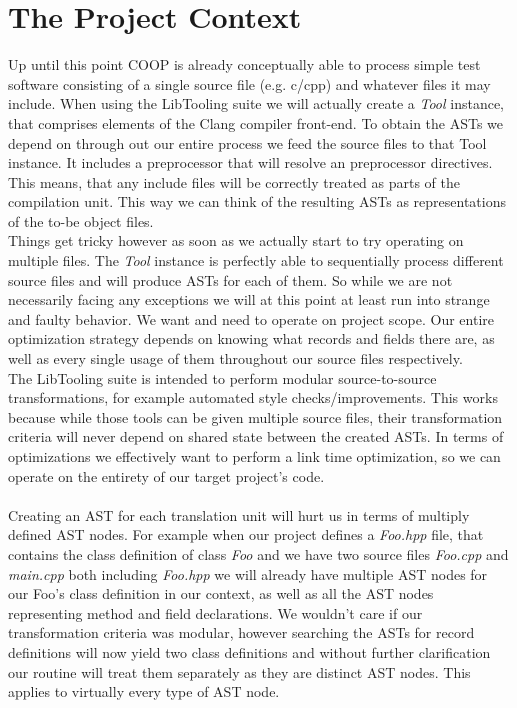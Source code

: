 \chapter{The Project Context}\label{project_scope_transformations}
Up until this point COOP is already conceptually able to process simple test software consisting of a single source file (e.g. c/cpp) and whatever files it may include. When using the LibTooling suite we will actually create a \textit{Tool} instance, that comprises elements of the Clang compiler front-end. To obtain the ASTs we depend on through out our entire process we feed the source files to that Tool instance. It includes a preprocessor that will resolve an preprocessor directives. This means, that any include files will be correctly treated as parts of the compilation unit. This way we can think of the resulting ASTs as representations of the to-be object files.\\
Things get tricky however as soon as we actually start to try operating on multiple files. The \textit{Tool} instance is perfectly able to sequentially process different source files and will produce ASTs for each of them. So while we are not necessarily facing any exceptions we will at this point at least run into strange and faulty behavior. We want and need to operate on project scope. Our entire optimization strategy depends on knowing what records and fields there are, as well as every single usage of them throughout our source files respectively.\\
The LibTooling suite is intended to perform modular source-to-source transformations, for example automated style checks/improvements. This works because while those tools can be given multiple source files, their transformation criteria will never depend on shared state between the created ASTs. In terms of optimizations we effectively want to perform a link time optimization, so we can operate on the entirety of our target project's code.\\\\
Creating an AST for each translation unit will hurt us in terms of multiply defined AST nodes. For example when our project defines a \textit{Foo.hpp} file, that contains the class definition of class \textit{Foo} and we have two source files \textit{Foo.cpp} and \textit{main.cpp} both including \textit{Foo.hpp} we will already have multiple AST nodes for our Foo's class definition in our context, as well as all the AST nodes representing method and field declarations. We wouldn't care if our transformation criteria was modular, however searching the ASTs for record definitions will now yield two class definitions and without further clarification our routine will treat them separately as they are distinct AST nodes. This applies to virtually every type of AST node.\\
